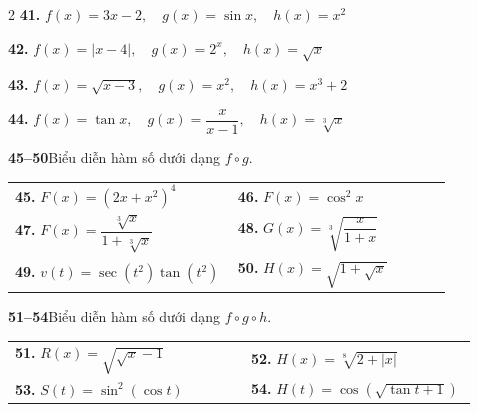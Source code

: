 \begin{multicols}{2}
\vspace{1pt}
\noindent\textbf{41.} $f(x) = 3x - 2, \quad g(x) = \sin x, \quad h(x) = x^2$

\vspace{1pt}
\noindent\textbf{42.} $f(x) = |x - 4|, \quad g(x) = 2^x, \quad h(x) = \sqrt{x}$

\vspace{1pt}
\noindent\textbf{43.} $f(x) = \sqrt{x - 3}, \quad g(x) = x^2, \quad h(x) = x^3 + 2$

\vspace{1pt}
\noindent\textbf{44.} $f(x) = \tan x, \quad g(x) = \dfrac{x}{x - 1}, \quad h(x) = \sqrt[3]{x}$

\vspace{3pt}
\noindent{\color{stewartcyan!60}\rule{\linewidth}{0.6pt}}
\vspace{3pt}

\noindent\textbf{\textsf{\color{stewartcyan}45--50}}\quad Biểu diễn hàm số dưới dạng $f \circ g$.

\vspace{1pt}
\noindent\begin{tabular*}{\linewidth}{@{}p{0.5\linewidth}p{0.48\linewidth}@{}}
\textbf{45.} $F(x) = (2x + x^2)^4$ & \textbf{46.} $F(x) = \cos^2 x$ \\[2pt]
\textbf{47.} $F(x) = \dfrac{\sqrt[3]{x}}{1 + \sqrt[3]{x}}$ & \textbf{48.} $G(x) = \sqrt[3]{\dfrac{x}{1 + x}}$ \\[2pt]
\textbf{49.} $v(t) = \sec(t^2)\tan(t^2)$ & \textbf{50.} $H(x) = \sqrt{1 + \sqrt{x}}$
\end{tabular*}

\vspace{3pt}
\noindent{\color{stewartcyan!60}\rule{\linewidth}{0.6pt}}
\vspace{3pt}

\noindent\textbf{\textsf{\color{stewartcyan}51--54}}\quad Biểu diễn hàm số dưới dạng $f \circ g \circ h$.

\vspace{1pt}
\noindent\begin{tabular*}{\linewidth}{@{}p{0.5\linewidth}p{0.48\linewidth}@{}}
\textbf{51.} $R(x) = \sqrt{\sqrt{x} - 1}$ & \textbf{52.} $H(x) = \sqrt[8]{2 + |x|}$ \\[2pt]
\textbf{53.} $S(t) = \sin^2(\cos t)$ & \textbf{54.} $H(t) = \cos(\sqrt{\tan t + 1})$
\end{tabular*}

\vspace{3pt}
\noindent{\color{stewartcyan!60}\rule{\linewidth}{0.6pt}}
\vspace{3pt}


\end{multicols}
